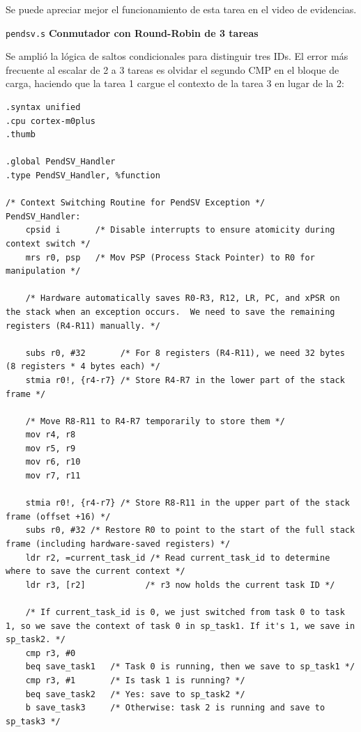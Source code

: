 \documentclass[12pt,letterpaper]{article}
\begin{document}
\bigskip

\noindent
Se puede apreciar mejor el funcionamiento de esta tarea en el video de evidencias.

\bigskip

\texttt{pendsv.s} \textbf{Conmutador con Round-Robin de 3 tareas}

\noindent
Se amplió la lógica de saltos condicionales para distinguir tres IDs. El error más frecuente al escalar de 2 a 3 tareas es olvidar el segundo CMP en el bloque de carga, haciendo que la tarea 1 cargue el contexto de la tarea 3 en lugar de la 2:

\begin{lstlisting}[style=modernc, caption={\texttt{pendsv.s}}]
.syntax unified
.cpu cortex-m0plus
.thumb

.global PendSV_Handler
.type PendSV_Handler, %function

/* Context Switching Routine for PendSV Exception */
PendSV_Handler:
    cpsid i       /* Disable interrupts to ensure atomicity during context switch */
    mrs r0, psp   /* Mov PSP (Process Stack Pointer) to R0 for manipulation */
    
    /* Hardware automatically saves R0-R3, R12, LR, PC, and xPSR on the stack when an exception occurs.  We need to save the remaining registers (R4-R11) manually. */
    
    subs r0, #32       /* For 8 registers (R4-R11), we need 32 bytes (8 registers * 4 bytes each) */
    stmia r0!, {r4-r7} /* Store R4-R7 in the lower part of the stack frame */
    
    /* Move R8-R11 to R4-R7 temporarily to store them */
    mov r4, r8
    mov r5, r9
    mov r6, r10
    mov r7, r11
 
    stmia r0!, {r4-r7} /* Store R8-R11 in the upper part of the stack frame (offset +16) */
    subs r0, #32 /* Restore R0 to point to the start of the full stack frame (including hardware-saved registers) */
    ldr r2, =current_task_id /* Read current_task_id to determine where to save the current context */
    ldr r3, [r2]            /* r3 now holds the current task ID */
    
    /* If current_task_id is 0, we just switched from task 0 to task 1, so we save the context of task 0 in sp_task1. If it's 1, we save in sp_task2. */
    cmp r3, #0
    beq save_task1   /* Task 0 is running, then we save to sp_task1 */
    cmp r3, #1       /* Is task 1 is running? */
    beq save_task2   /* Yes: save to sp_task2 */
    b save_task3     /* Otherwise: task 2 is running and save to sp_task3 */


\end{lstlisting}
\end{document}
